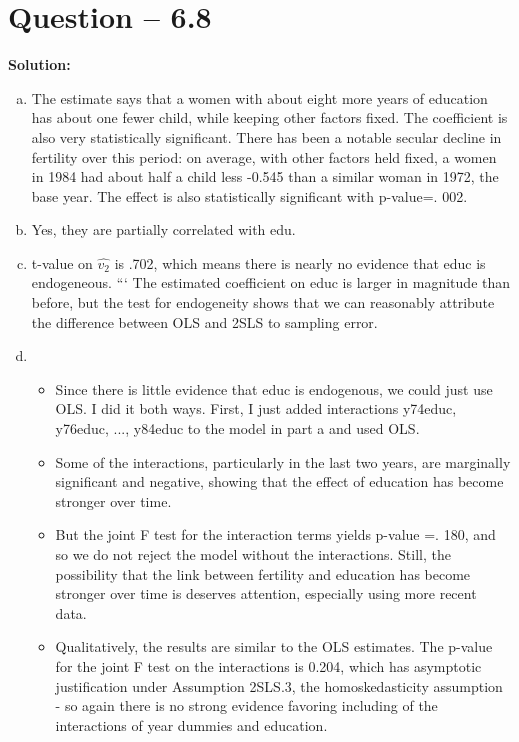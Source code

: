 \documentclass[11pt]{article} %
\begin{document}
\section{Question -- 6.8}
\textbf{Solution:}
\begin{enumerate}[a)]
    \item The estimate says that a women with about eight more years of education has about one fewer child, while keeping other factors fixed. The coefficient is also very statistically significant.  There has been a notable secular decline in fertility over this period: on average, with other factors held fixed, a women in 1984 had about half a child less -0.545 than a similar woman in 1972, the base year. The effect is also statistically significant with p-value=. 002.
    \item Yes, they are partially correlated with edu. 
    \item t-value on $\hat{v_2}$ is .702, which means there is nearly no evidence that educ is endogeneous. ```
    The estimated coefficient on educ is larger in magnitude than before, but the test for endogeneity shows that we can reasonably attribute the difference between OLS and 2SLS to sampling error. 
    \item \begin{itemize}
        \item Since there is little evidence that educ is endogenous, we could just use OLS. I did it both ways. First, I just added interactions y74educ, y76educ, ..., y84educ to the model in part a and used OLS.
        \item Some of the interactions, particularly in the last two years, are marginally significant and negative, showing that the effect of education has become stronger over time. 
        \item But the joint F test for the interaction terms yields p-value =. 180, and so we do not reject the model without the interactions. Still, the possibility that the link between fertility and education has become stronger over time is deserves attention, especially using more recent data.  
        \item Qualitatively, the results are similar to the OLS estimates. The p-value for the joint F test on the interactions is 0.204, which has asymptotic justification under Assumption 2SLS.3, the homoskedasticity assumption - so again there is no strong evidence favoring including of the interactions of year dummies and education.
    \end{itemize}
\end{enumerate}
\end{document}
